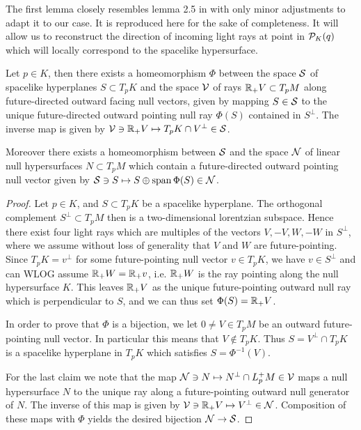 The first lemma closely resembles lemma 2.5 in \cite{hintzpaper} with only minor adjustments to adapt it to our case. It is reproduced here for the sake of completeness. It will allow us to reconstruct the direction of incoming light rays at point in ${\mathcal{P}}_K(q)$ which will locally correspond to the spacelike hypersurface.
\begin{lemma}\label{lem:dirreconstr}
Let $p\in K$, then there exists a homeomorphism $\Phi$ between the space ${\mathcal{S}}$ of spacelike hyperplanes $S\subset T_pK$ and the space ${\mathcal{V}}$ of rays $\mathbb{R}_+V\subset T_pM$ along future-directed outward facing null vectors, given by mapping $S\in {\mathcal{S}}$ to the unique future-directed outward pointing null ray $\Phi(S)$ contained in $S^\perp$. The inverse map is given by ${\mathcal{V}}\ni \mathbb{R}_+V \mapsto T_pK \cap V^\perp\in {\mathcal{S}}$.

Moreover there exists a homeomorphism between ${\mathcal{S}}$ and the space ${\mathcal{N}}$ of linear null hypersurfaces $N\subset T_pM$ which contain a future-directed outward pointing null vector given by ${\mathcal{S}}\ni S\mapsto S\oplus \operatorname{span} \Phi(S)\in {\mathcal{N}}$.
\end{lemma}
\begin{proof}
    Let $p\in K$, and $S\subset T_pK$ be a spacelike hyperplane. The orthogonal complement $S^\perp\subset T_pM$ then is a two-dimensional lorentzian subspace. Hence there exist four light rays which are multiples of the vectors $V,-V,W,-W$ in $S^\perp$, where we assume without loss of generality that $V$ and $W$ are future-pointing. Since $T_pK=v^\perp$ for some future-pointing null vector $v\in T_pK$, we have $v\in S^\perp$ and can WLOG assume $\mathbb{R}_+W=\mathbb{R}_+v$, i.e. $\mathbb{R}_+W$ is the ray pointing along the null hypersurface $K$. This leaves $\mathbb{R}_+V$ as the unique future-pointing outward null ray which is perpendicular to $S$, and we can thus set $\Phi(S)=\mathbb{R}_+V$.

    In order to prove that $\Phi$ is a bijection, we let $0\neq V\in T_pM$ be an outward future-pointing null vector. In particular this means that $V\notin T_pK$. Thus $S=V^\perp\cap T_pK$ is a spacelike hyperplane in $T_pK$ which satisfies $S=\Phi^{-1}(V)$.

    For the last claim we note that the map ${\mathcal{N}}\ni N \mapsto N^\perp \cap L^+_pM \in {\mathcal{V}}$ maps a null hypersurface $N$ to the unique ray along a future-pointing outward null generator of $N$. The inverse of this map is given by ${\mathcal{V}}\ni \mathbb{R}_+V\mapsto V^\perp \in {\mathcal{N}}$. Composition of these maps with $\Phi$ yields the desired bijection ${\mathcal{N}}\to {\mathcal{S}}$.
\end{proof}

